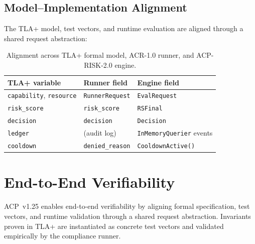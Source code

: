 \documentclass[11pt]{article}
\theoremstyle{definition}
\begin{document}
\subsection{Model--Implementation Alignment}

The TLA+ model, test vectors, and runtime evaluation are aligned through a shared
request abstraction:

\begin{table}[h!]
\centering
\small
\begin{tabular}{@{}lll@{}}
\toprule
\textbf{TLA+ variable} & \textbf{Runner field} & \textbf{Engine field} \\
\midrule
\texttt{capability}, \texttt{resource} & \texttt{RunnerRequest} & \texttt{EvalRequest} \\
\texttt{risk\_score}                   & \texttt{risk\_score}   & \texttt{RSFinal} \\
\texttt{decision}                      & \texttt{decision}      & \texttt{Decision} \\
\texttt{ledger}                        & (audit log)            & \texttt{InMemoryQuerier} events \\
\texttt{cooldown}                      & \texttt{denied\_reason} & \texttt{CooldownActive()} \\
\bottomrule
\end{tabular}
\caption{Alignment across TLA+ formal model, ACR-1.0 runner, and ACP-RISK-2.0 engine.}
\end{table}

\section{End-to-End Verifiability}
\label{sec:e2e-verifiability}

ACP~v1.25 enables end-to-end verifiability by aligning formal specification,
test vectors, and runtime validation through a shared request abstraction.
Invariants proven in TLA+ are instantiated as concrete test vectors
and validated empirically by the compliance runner.
\end{document}

